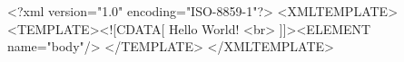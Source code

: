 <?xml version="1.0" encoding="ISO-8859-1"?> <XMLTEMPLATE>
    <TEMPLATE><![CDATA[
            Hello World! <br>
        ]]><ELEMENT name="body"/>
    </TEMPLATE>
</XMLTEMPLATE>
